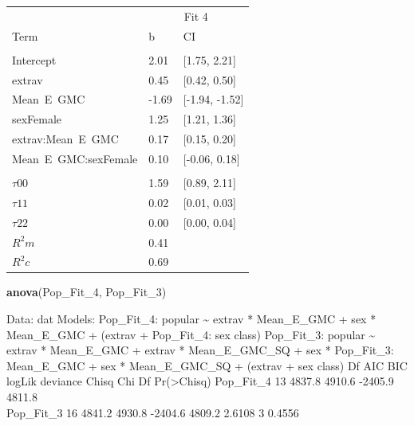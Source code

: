 \documentclass[]{article}
\newenvironment{Shaded}{\begin{snugshade}}{\end{snugshade}}
\newcommand{\KeywordTok}[1]{\textcolor[rgb]{0.13,0.29,0.53}{\textbf{#1}}}
\newcommand{\DecValTok}[1]{\textcolor[rgb]{0.00,0.00,0.81}{#1}}
\newcommand{\NormalTok}[1]{#1}
\begin{document}
\begin{tabular}{lll}
\toprule
\multicolumn{1}{c}{ } & \multicolumn{2}{c}{Fit 4} \\
\cmidrule(l{2pt}r{2pt}){2-3}
Term & b & CI\\
\midrule
\addlinespace[0.3em]
\multicolumn{3}{l}{\textbf{Fixed}}\\
\hspace{1em}Intercept & 2.01 & [1.75, 2.21]\\
\hspace{1em}extrav & 0.45 & [0.42, 0.50]\\
\hspace{1em}Mean\ E\ GMC & -1.69 & [-1.94, -1.52]\\
\hspace{1em}sexFemale & 1.25 & [1.21, 1.36]\\
\hspace{1em}extrav:Mean\ E\ GMC & 0.17 & [0.15, 0.20]\\
\hspace{1em}Mean\ E\ GMC:sexFemale & 0.10 & [-0.06, 0.18]\\
\addlinespace[0.3em]
\multicolumn{3}{l}{\textbf{Random}}\\
\hspace{1em}$\tau {00}$ & 1.59 & [0.89, 2.11]\\
\hspace{1em}$\tau {11}$ & 0.02 & [0.01, 0.03]\\
\hspace{1em}$\tau {22}$ & 0.00 & [0.00, 0.04]\\
$R^2 m$ & 0.41 & \\
$R^2 c$ & 0.69 & \\
\bottomrule
\end{tabular}

\begin{Shaded}
\begin{Highlighting}[]
\KeywordTok{anova}\NormalTok{(Pop_Fit_}\DecValTok{4}\NormalTok{, Pop_Fit_}\DecValTok{3}\NormalTok{)}
\end{Highlighting}
\end{Shaded}

Data: dat Models: Pop\_Fit\_4: popular \textasciitilde{} extrav *
Mean\_E\_GMC + sex * Mean\_E\_GMC + (extrav + Pop\_Fit\_4: sex
\textbar{} class) Pop\_Fit\_3: popular \textasciitilde{} extrav *
Mean\_E\_GMC + extrav * Mean\_E\_GMC\_SQ + sex * Pop\_Fit\_3:
Mean\_E\_GMC + sex * Mean\_E\_GMC\_SQ + (extrav + sex \textbar{} class)
Df AIC BIC logLik deviance Chisq Chi Df Pr(\textgreater{}Chisq)
Pop\_Fit\_4 13 4837.8 4910.6 -2405.9 4811.8\\
Pop\_Fit\_3 16 4841.2 4930.8 -2404.6 4809.2 2.6108 3 0.4556
\end{document}
